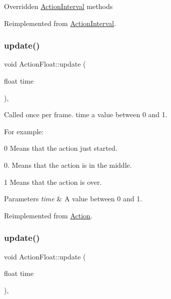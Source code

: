 Overridden \hyperlink{classActionInterval}{Action\+Interval} methods 

Reimplemented from \hyperlink{classActionInterval_ad3d91186b2c3108488ddbbdbbd982484}{Action\+Interval}.

\mbox{\label{classActionFloat_a0b6b333b5524a617f3088b2c1893b55c}} 
\subsubsection{\texorpdfstring{update()}{update()}\hspace{0.1cm}{\footnotesize\ttfamily [1/2]}}
{\footnotesize\ttfamily void Action\+Float\+::update (\begin{DoxyParamCaption}\item[{float}]{time }\end{DoxyParamCaption})\hspace{0.3cm}{\ttfamily [override]}, {\ttfamily [virtual]}}

Called once per frame. time a value between 0 and 1.

For example\+:
\begin{DoxyItemize}
\item 0 Means that the action just started.
\item 0. Means that the action is in the middle.
\item 1 Means that the action is over.
\end{DoxyItemize}


\begin{DoxyParams}{Parameters}
{\em time} & A value between 0 and 1. \\
\hline
\end{DoxyParams}


Reimplemented from \hyperlink{classAction_a937e646e63915e33ad05ba149bfcf239}{Action}.

\mbox{\label{classActionFloat_a0b6b333b5524a617f3088b2c1893b55c}} 
\subsubsection{\texorpdfstring{update()}{update()}\hspace{0.1cm}{\footnotesize\ttfamily [2/2]}}
{\footnotesize\ttfamily void Action\+Float\+::update (\begin{DoxyParamCaption}\item[{float}]{time }\end{DoxyParamCaption})\hspace{0.3cm}{\ttfamily [override]}, {\ttfamily [virtual]}}

